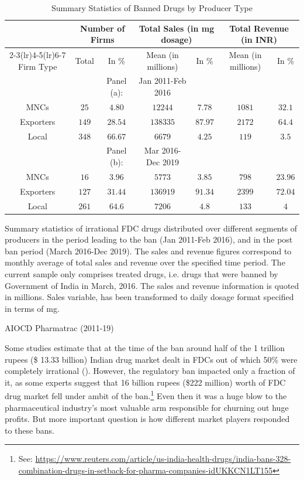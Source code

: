\documentclass[AER]{AEA}
\theoremstyle{theorem}
\begin{document}
\begin{table}[h!] \centering 
	\caption{Summary Statistics of Banned Drugs by Producer Type} 
	\label{Table-1} 
	\begin{tabular}{ccccccc}
		\toprule
		& \multicolumn{2}{c}{Number of Firms} & \multicolumn{2}{c}{Total Sales (in mg dosage)} & \multicolumn{2}{c}{Total Revenue (in INR)} \\ 
		\cmidrule(lr){2-3}\cmidrule(lr){4-5}\cmidrule(lr){6-7}
		Firm Type & Total & In \% & Mean (in millions) & In \% & Mean (in millions) & In \% \\ 
		\midrule
		&  & Panel (a): & Jan 2011-Feb 2016 &  &  &  \\ 
		\midrule
		MNCs & $25$ & $4.80$ & $12244$ & $7.78$ & $1081$ & $32.1$ \\ 
		Exporters & $149$ & $28.54$ & $138335$ & $87.97$ & $2172$ & $64.4$ \\ 
		Local  & $348$ & $66.67$ & $6679$ & $4.25$ & $119$ & $3.5$ \\ 
		\midrule
		&  & Panel (b):  & Mar 2016-Dec 2019 &  &  &  \\
		\midrule
		MNCs & $16$ & $3.96$ & $5773$ & $3.85$ & $798$ & $23.96$ \\ 
		Exporters & $127$ & $31.44$ & $136919$ & $91.34$ & $2399$ & $72.04$ \\ 
		Local  & $261$ & $64.6$ & $7206$ & $4.8$ & $133$ & $4$ \\ 
		\toprule 
	\end{tabular}
	\begin{tablenotes}
		Summary statistics of irrational FDC drugs distributed over different segments of producers in the period leading to the ban (Jan 2011-Feb 2016), and in the post ban period (March 2016-Dec 2019). The sales and revenue figures correspond to monthly average of total sales and revenue over the specified time period.
		The current sample only comprises treated drugs, i.e. drugs that were banned by Government of India in March, 2016. The sales and revenue information is quoted in millions. Sales variable, has been transformed to daily dosage format specified in terms of mg.
	\end{tablenotes}
	\begin{tablenotes}[Source]
		AIOCD Pharmatrac (2011-19)
	\end{tablenotes}
\end{table} 


Some studies estimate that at the time of the ban around half of the 1 trillion rupees (\$ 13.33 billion) Indian drug market dealt in FDCs out of which 50\% were completely irrational (\cite{srinivasan2018fixed}). However, the regulatory ban impacted  only a fraction of it, as some experts suggest that 16 billion rupees (\$222 million)  worth of FDC drug market fell under  ambit of the ban.\footnote{See: \url{https://www.reuters.com/article/us-india-health-drugs/india-bans-328-combination-drugs-in-setback-for-pharma-companies-idUKKCN1LT155}} Even then it was a huge blow to the pharmaceutical industry's most valuable arm responsible for churning out huge profits. But more important question is how different market players responded to these bans. 
\end{document}
